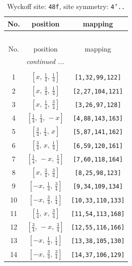 \documentclass[fleqn,8pt]{jsarticle}
\begin{document}
\begin{longtable}{ccc}
\caption{Wyckoff site: {\tt 48f}, site symmetry: {\tt 4'..}}
 \\
 \hline \hline
No. & position & mapping \\ \hline \endfirsthead

\multicolumn{2}{l}{\tablename\ \thetable{}} \\
 \hline \hline
No. & position & mapping \\ \hline \endhead

 \hline \hline
\multicolumn{2}{r}{\footnotesize\it continued ...} \\ \endfoot

 \hline \hline
\multicolumn{2}{r}{} \\ \endlastfoot

1 & $\left[ x,\, \frac{1}{4},\, \frac{1}{4} \right]$ & {\tt [1,32,99,122]} \\ \hline
2 & $\left[ x,\, \frac{3}{4},\, \frac{1}{4} \right]$ & {\tt [2,27,104,121]} \\ \hline
3 & $\left[ x,\, \frac{1}{4},\, \frac{3}{4} \right]$ & {\tt [3,26,97,128]} \\ \hline
4 & $\left[ \frac{1}{4},\, \frac{1}{4},\, - x \right]$ & {\tt [4,88,143,163]} \\ \hline
5 & $\left[ \frac{3}{4},\, \frac{1}{4},\, x \right]$ & {\tt [5,87,141,162]} \\ \hline
6 & $\left[ \frac{3}{4},\, x,\, \frac{1}{4} \right]$ & {\tt [6,59,120,161]} \\ \hline
7 & $\left[ \frac{1}{4},\, - x,\, \frac{1}{4} \right]$ & {\tt [7,60,118,164]} \\ \hline
8 & $\left[ x,\, \frac{3}{4},\, \frac{3}{4} \right]$ & {\tt [8,25,98,123]} \\ \hline
9 & $\left[ - x,\, \frac{1}{4},\, \frac{3}{4} \right]$ & {\tt [9,34,109,134]} \\ \hline
10 & $\left[ - x,\, \frac{3}{4},\, \frac{1}{4} \right]$ & {\tt [10,33,110,133]} \\ \hline
11 & $\left[ \frac{1}{4},\, x,\, \frac{3}{4} \right]$ & {\tt [11,54,113,168]} \\ \hline
12 & $\left[ \frac{3}{4},\, - x,\, \frac{3}{4} \right]$ & {\tt [12,55,116,166]} \\ \hline
13 & $\left[ - x,\, \frac{1}{4},\, \frac{1}{4} \right]$ & {\tt [13,38,105,130]} \\ \hline
14 & $\left[ - x,\, \frac{3}{4},\, \frac{3}{4} \right]$ & {\tt [14,37,106,129]} \\ \hline

\end{longtable}
\end{document}

